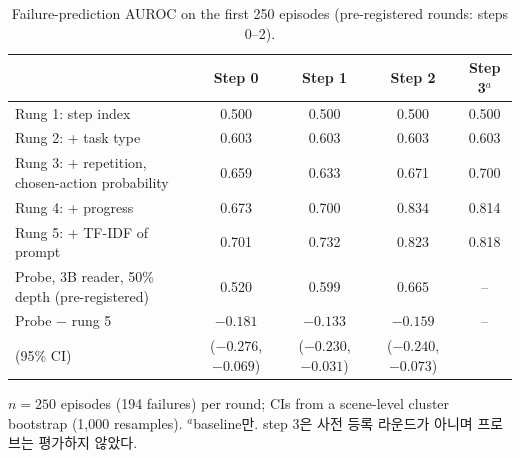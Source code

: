 \begin{table}[htbp]
\centering\small
\caption{Failure-prediction AUROC on the first 250 episodes (pre-registered rounds: steps 0--2).}\label{tab:ladder}
\begin{tabularx}{\linewidth}{@{}Lcccc@{}}
\toprule
 & Step 0 & Step 1 & Step 2 & Step 3$^{a}$ \\
\midrule
Rung 1: step index & 0.500 & 0.500 & 0.500 & 0.500 \\
Rung 2: + task type & 0.603 & 0.603 & 0.603 & 0.603 \\
Rung 3: + repetition, chosen-action probability & 0.659 & 0.633 & 0.671 & 0.700 \\
Rung 4: + progress & 0.673 & 0.700 & 0.834 & 0.814 \\
Rung 5: + TF-IDF of prompt & 0.701 & 0.732 & 0.823 & 0.818 \\
Probe, 3B reader, 50\% depth (pre-registered) & 0.520 & 0.599 & 0.665 & -- \\
\addlinespace
Probe $-$ rung 5 & $-0.181$ & $-0.133$ & $-0.159$ & -- \\
\quad (95\% CI) & ($-0.276$, $-0.069$) & ($-0.230$, $-0.031$) & ($-0.240$, $-0.073$) & \\
\bottomrule
\end{tabularx}
\par\smallskip\raggedright\footnotesize
$n = 250$ episodes (194 failures) per round; CIs from a scene-level cluster bootstrap (1,000 resamples). $^{a}$baseline만. step 3은 사전 등록 라운드가 아니며 프로브는 평가하지 않았다.
\end{table}
